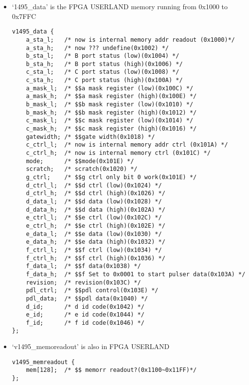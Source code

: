 \documentclass[11pt]{article}
\begin{document}
		\begin{itemize}
		\item `1495\_data' is the FPGA USERLAND memory running from 0x1000 to 0x7FFC
			\begin{lstlisting}
v1495_data {                                                                                                                                                                                                        
    a_sta_l;   /* now is internal memory addr readout (0x1000)*/
    a_sta_h;   /* now ??? undefine(0x1002) */
    b_sta_l;   /* B port status (low)(0x1004) */
    b_sta_h;   /* B port status (high)(0x1006) */
    c_sta_l;   /* C port status (low)(0x1008) */
    c_sta_h;   /* C port status (high)(0x100A) */
    a_mask_l;  /* $$a mask register (low)(0x100C) */
    a_mask_h;  /* $$a mask register (high)(0x100E) */
    b_mask_l;  /* $$b mask register (low)(0x1010) */
    b_mask_h;  /* $$b mask register (high)(0x1012) */
    c_mask_l;  /* $$c mask register (low)(0x1014) */
    c_mask_h;  /* $$c mask register (high)(0x1016) */
    gatewidth; /* $$gate width(0x1018) */
    c_ctrl_l;  /* now is internal memory addr ctrl (0x101A) */
    c_ctrl_h;  /* now is internal memory ctrl (0x101C) */
    mode;      /* $$mode(0x101E) */
    scratch;   /* scratch(0x1020) */
    g_ctrl;    /* $$g ctrl only bit 0 work(0x101E) */
    d_ctrl_l;  /* $$d ctrl (low)(0x1024) */
    d_ctrl_h;  /* $$d ctrl (high)(0x1026) */
    d_data_l;  /* $$d data (low)(0x1028) */
    d_data_h;  /* $$d data (high)(0x102A) */
    e_ctrl_l;  /* $$e ctrl (low)(0x102C) */
    e_ctrl_h;  /* $$e ctrl (high)(0x102E) */
    e_data_l;  /* $$e data (low)(0x1030) */
    e_data_h;  /* $$e data (high)(0x1032) */
    f_ctrl_l;  /* $$f ctrl (low)(0x1034) */
    f_ctrl_h;  /* $$f ctrl (high)(0x1036) */
    f_data_l;  /* $$f data(0x1038) */
    f_data_h;  /* $$f Set to 0x0001 to start pulser data(0x103A) */
    revision;  /* revision(0x103C) */
    pdl_ctrl;  /* $$pdl control(0x103E) */
    pdl_data;  /* $$pdl data(0x1040) */
    d_id;      /* d id code(0x1042) */
    e_id;      /* e id code(0x1044) */
    f_id;      /* f id code(0x1046) */
};
			\end{lstlisting}
			
		\item `v1495\_memoreadout' is also in FPGA USERLAND
			\begin{lstlisting}
v1495_memreadout {                                                                                                                                                                                                  
    mem[128];  /* $$ memorr readout?(0x1100~0x11FF)*/
};			
			\end{lstlisting}


\end{itemize}
\end{document}
